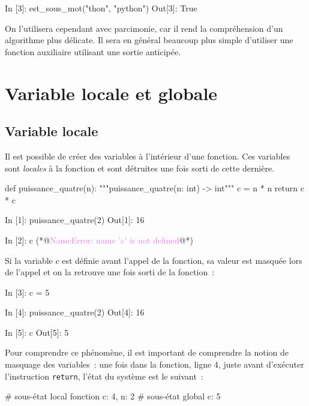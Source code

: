 \documentclass{magnoliaold}
\begin{document}
\begin{pythoncode}
In [3]: est_sous_mot("thon", "python")
Out[3]: True
\end{pythoncode}
\noindent
On l'utilisera cependant avec parcimonie, car il rend la compréhension d'un algorithme plus délicate. Il sera en
général beaucoup plus simple d'utiliser une fonction auxiliaire utilisant une sortie anticipée.





\section{Variable locale et globale}
\subsection{Variable locale}


Il est possible de créer des variables à l'intérieur d'une fonction. Ces variables sont
\emph{locales} à la fonction et sont détruites une fois sorti de cette dernière.

\begin{pythoncodeline}
def puissance_quatre(n):
    """puissance_quatre(n: int) -> int"""
    c = n * n
    return c * c
\end{pythoncodeline}

\begin{pythoncode}
In [1]: puissance_quatre(2)
Out[1]: 16

In [2]: c
(*@\textcolor{violet}{NameError: name 'c' is not defined}@*)
\end{pythoncode}

\noindent
Si la variable $c$ est définie avant l'appel de la fonction, sa valeur est
masquée lors de l'appel et on la retrouve une fois sorti de la fonction~:

\begin{pythoncode}
In [3]: c = 5

In [4]: puissance_quatre(2)
Out[4]: 16

In [5]: c
Out[5]: 5
\end{pythoncode}

\noindent
Pour comprendre ce phénomène, il est important de comprendre la notion de masquage des variables~:
une fois dans la fonction, ligne 4, juste avant d'exécuter l'instruction \verb_return_,
l'état du système est le suivant~:

\begin{pythoncode}
# sous-état local fonction  {c: 4, n: 2}
# sous-état global          {c: 5}
\end{pythoncode}
\end{document}
